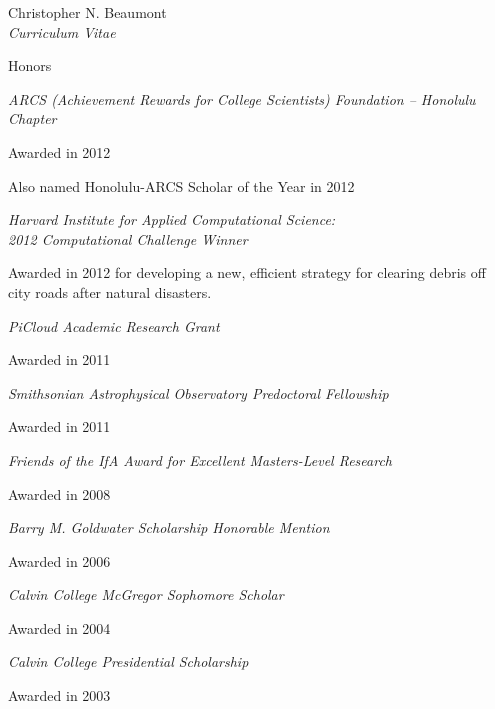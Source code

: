 \documentclass[10pt]{article}
\newenvironment{sublist}{%
	\begin{list}{}{%
		\setlength{\itemsep}{0em}\setlength{\parsep}{0em}%
		\setlength{\topsep}{0em}\setlength{\parskip}{0em}%
	}%
}%
{ \end{list} }
\begin{document}
\begin{cv}{Christopher N. Beaumont\\{\large \itshape Curriculum Vitae}}
\begin{cvlist}{Honors}
\item
	\emph{ARCS (Achievement Rewards for College Scientists) Foundation -- Honolulu Chapter}
	\begin{sublist}
	\item Awarded in 2012
	\item Also named Honolulu-ARCS Scholar of the Year in 2012
	\end{sublist}
\item
       \emph{Harvard Institute for Applied Computational Science: \\ 2012 Computational Challenge Winner}
        \begin{sublist}
        \item Awarded in 2012 for developing a new, efficient strategy for clearing debris off city roads after natural disasters.
        \end{sublist}
\item
	\emph{PiCloud Academic Research Grant}
	\begin{sublist}
	\item Awarded in 2011
	\end{sublist}
\item
	\emph{Smithsonian Astrophysical Observatory Predoctoral Fellowship}
	\begin{sublist}
	\item Awarded in 2011
	\end{sublist}
\item
	\emph{Friends of the IfA Award for Excellent Masters-Level Research}
	\begin{sublist}
	\item Awarded in 2008
	\end{sublist}

\item
	\emph{Barry M. Goldwater Scholarship Honorable Mention}
	\begin{sublist}
	\item Awarded in 2006
	\end{sublist}

\item
	\emph{Calvin College McGregor Sophomore Scholar}
	\begin{sublist}
	\item Awarded in 2004
	\end{sublist}

\item
	\emph{Calvin College Presidential Scholarship}
	\begin{sublist}
	\item Awarded in 2003
	\end{sublist}


\end{cvlist}
\end{cv}
\end{document}
